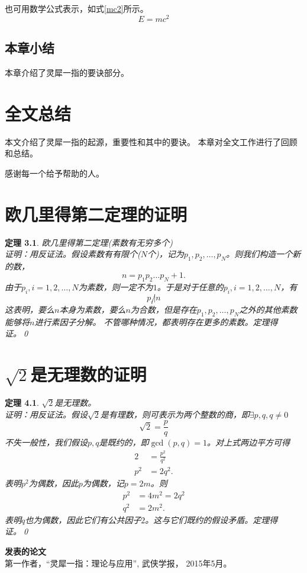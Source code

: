 \documentclass[algorithmlist, figurelist,tablelist, nomlist,engineering]{seuthesix}
\begin{document}
也可用数学公式表示，如式\ref{mc2}所示。
\begin{equation}
E=mc^2
\label{mc2}
\end{equation}

\section{本章小结}
本章介绍了灵犀一指的要诀部分。




\chapter{全文总结}
本文介绍了灵犀一指的起源，重要性和其中的要诀。
本章对全文工作进行了回顾和总结。

\acknowledgement
感谢每一个给予帮助的人。



\appendix

\chapter{欧几里得第二定理的证明}
\newtheorem{theorem}{定理}
\begin{theorem}
欧几里得第二定理(素数有无穷多个)\\
证明：用反证法。假设素数有有限个($N$个)，记为$p_1,p_2,\dots,p_N$。则我们构造一个新的数，
\[
n=p_1p_2\dots p_N+1.
\]
由于$p_i,i=1,2,\dots,N$为素数，则一定不为$1$。于是对于任意的$p_i,i=1,2,\dots, N$，有
\[
p_i\not|n
\]
这表明，要么$n$本身为素数，要么$n$为合数，但是存在$p_1,p_2,\dots,p_N$之外的其他素数能够将$n$进行素因子分解。
不管哪种情况，都表明存在更多的素数。定理得证。\qed
\end{theorem}

\chapter{$\sqrt{2}$是无理数的证明}
\begin{theorem}
$\sqrt{2}$是无理数。\\
证明：用反证法。假设$\sqrt{2}$是有理数，则可表示为两个整数的商，即$\exists p,q, q\ne0$
\[
\sqrt{2}=\frac{p}{q}
\]
不失一般性，我们假设$p,q$是既约的，即$\gcd(p,q)=1$。对上式两边平方可得\\
\begin{align*}
2& =\frac{p^2}{q^2}\\
p^2&=2q^2.
\end{align*}
表明$p^2$为偶数，因此$p$为偶数，记$p=2m$。则
\begin{align*}
p^2&=4m^2=2q^2\\
q^2&=2m^2.
\end{align*}
表明$q$也为偶数，因此它们有公共因子$2$。这与它们既约的假设矛盾。定理得证。\qed
\end{theorem}

\begin{flushleft}
{\bfseries \large 发表的论文}\\ \relax
[1] 第一作者，“灵犀一指：理论与应用”, 武侠学报，
2015年5月。\\
\end{flushleft}
\end{document}
